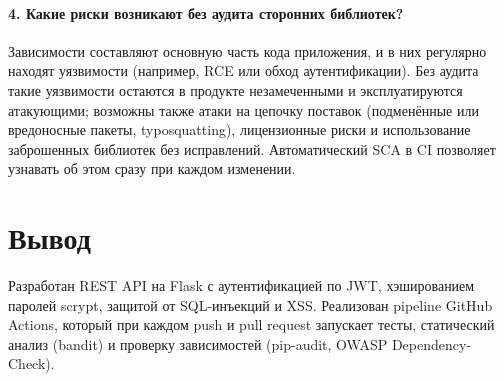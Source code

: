 \documentclass[12pt,a4paper]{article}
\begin{document}
\paragraph{4. Какие риски возникают без аудита сторонних библиотек?}
Зависимости составляют основную часть кода приложения, и в них регулярно находят уязвимости (например, RCE или обход
аутентификации). Без аудита такие уязвимости остаются в продукте незамеченными и эксплуатируются атакующими; возможны также
атаки на цепочку поставок (подменённые или вредоносные пакеты, typosquatting), лицензионные риски и использование
заброшенных библиотек без исправлений. Автоматический SCA в CI позволяет узнавать об этом сразу при каждом изменении.

\section*{Вывод}
Разработан REST API на Flask с аутентификацией по JWT, хэшированием паролей scrypt, защитой от SQL-инъекций и XSS.
Реализован pipeline GitHub Actions, который при каждом push и pull request запускает тесты, статический анализ (bandit) и
проверку зависимостей (pip-audit, OWASP Dependency-Check).
\end{document}
